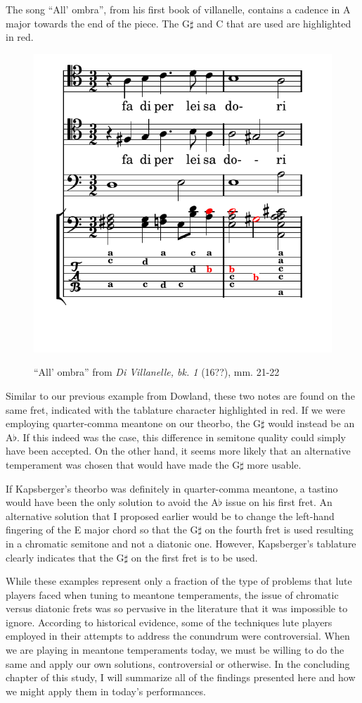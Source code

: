 The song ``All' ombra'', from his first book of villanelle, contains a cadence in A major
towards the end of the piece.  The G$\sharp$ and C that are used are highlighted in red.
\begin{figure}[h]
\centering
\includegraphics{examples/kaps_ombria.pdf}
\label{kaps-ombria}
\caption{``All' ombra'' from \textit{Di Villanelle, bk. 1} (16??), mm. 21-22 }
\end{figure}
Similar to our previous example from Dowland, these two notes are found on the
same fret, indicated with the tablature character  highlighted in red.
If we were employing quarter-comma meantone on our theorbo, the G$\sharp$ would
instead be an A$\flat$. If this indeed was the case, this difference in semitone
quality could simply have been accepted.  On the other hand, it seems more
likely that an alternative temperament was chosen that would have made the
G$\sharp$ more usable.

If Kapsberger's theorbo was definitely in quarter-comma meantone, a tastino would have
been the only solution to avoid the A$\flat$ issue on his first fret.  An alternative
solution that I proposed earlier would be to change the left-hand fingering of the E
major chord so that the G$\sharp$ on the fourth fret is used resulting in a chromatic
semitone and not a diatonic one.  However, Kapsberger's tablature clearly indicates
that the G$\sharp$ on the first fret is to be used.

While these examples represent only a fraction of the type of problems that lute players faced when
tuning to meantone temperaments, the issue of chromatic versus diatonic frets was so pervasive in
the literature that it was impossible to ignore. According to historical evidence, some of the
techniques lute players employed in  their attempts to address the conundrum were controversial.
When we are playing in meantone temperaments today, we must be willing to do the same and apply our
own solutions, controversial or otherwise.  In the concluding chapter of this study, I will
summarize all of the findings presented here and how we might apply them in today's performances.
